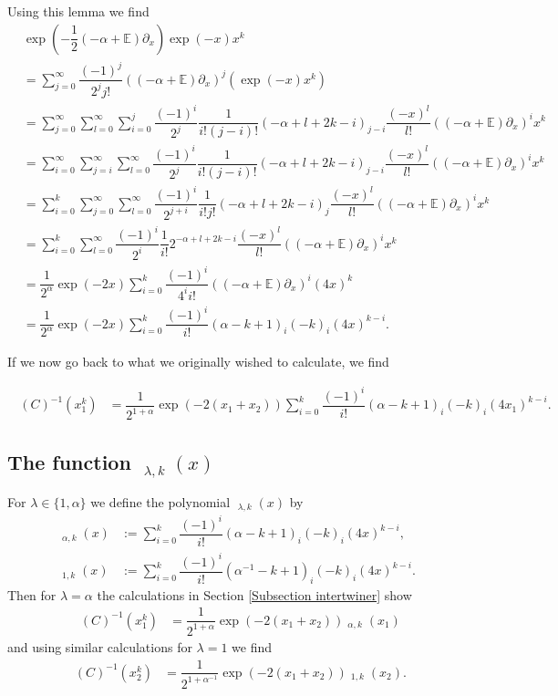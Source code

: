 \documentclass{amsart}
\numberwithin{theorem}{section}
\theoremstyle{definition}
\theoremstyle{remark}
\def\E{\mathds{E} }
\DeclareMathOperator{\KO}{\widetilde U}
\newcommand{\iSB}{\pil(C)^{-1}}
\newcommand{\pt}[1]{\partial_{#1}}
\DeclareMathOperator{\pil}{\pi_\lambda}
\begin{document}
Using this lemma we find
\begin{align*}
&\exp(-\dfrac{1}{2}(-\alpha  + \E)\pt {x})\exp(-x)x^k\\
&= \sum_{j=0}^\infty \dfrac{(-1)^j}{2^j j!}((-\alpha+\E)\pt x)^j(\exp(-x)x^k) \\
&= \sum_{j=0}^\infty \sum_{l=0}^\infty\sum_{i=0}^j\dfrac{(-1)^i}{2^j}\dfrac{1}{i!(j-i)!}(-\alpha+l+2k-i)_{j-i}\dfrac{(-x)^l}{l!}((-\alpha+\E)\pt x)^ix^k\\
&= \sum_{i=0}^\infty \sum_{j=i}^{\infty}\sum_{l=0}^\infty\dfrac{(-1)^i}{2^j}\dfrac{1}{i!(j-i)!}(-\alpha+l+2k-i)_{j-i}\dfrac{(-x)^l}{l!}((-\alpha+\E)\pt x)^ix^k\\
&= \sum_{i=0}^k \sum_{j=0}^{\infty}\sum_{l=0}^\infty\dfrac{(-1)^i}{2^{j+i}}\dfrac{1}{i!j!}(-\alpha+l+2k-i)_{j}\dfrac{(-x)^l}{l!}((-\alpha+\E)\pt x)^ix^k\\
&= \sum_{i=0}^k \sum_{l=0}^\infty\dfrac{(-1)^i}{2^{i}}\dfrac{1}{i!}2^{-\alpha+l+2k-i}\dfrac{(-x)^l}{l!}((-\alpha+\E)\pt x)^ix^k\\
&= \dfrac{1}{2^\alpha}\exp(-2x)\sum_{i=0}^k\dfrac{(-1)^i}{4^ii!}((-\alpha+\E)\pt x)^i(4x)^k\\
&= \dfrac{1}{2^\alpha}\exp(-2x)\sum_{i=0}^k \dfrac{(-1)^{i}}{i!}(\alpha-k+1)_i(-k)_i (4x)^{k-i}.
\end{align*}

If we now go back to what we originally wished to calculate, we find

\begin{align*}
\iSB(x_1^k) &= \dfrac{1}{2^{1+\alpha}}\exp(-2(x_1+x_2))\sum_{i=0}^k \dfrac{(-1)^{i}}{i!}(\alpha-k+1)_i(-k)_i (4x_1)^{k-i}.
\end{align*}

\subsection{The function $\KO_{\lambda,k}(x)$}

For $\lambda\in\{1,\alpha\}$ we define the polynomial $\KO_{\lambda,k}(x)$ by
\begin{align*}
\KO_{\alpha,k}(x) &:= \sum_{i=0}^k \dfrac{(-1)^{i}}{i!}(\alpha-k+1)_i(-k)_i (4x)^{k-i},\\
\KO_{1,k}(x) &:=  \sum_{i=0}^k \dfrac{(-1)^{i}}{i!}(\alpha^{-1}-k+1)_i(-k)_i (4x)^{k-i}.
\end{align*}
Then for $\lambda=\alpha$ the calculations in Section \ref{Subsection intertwiner} show
\begin{align*}
\iSB(x_1^k) &= \dfrac{1}{2^{1+\alpha}}\exp(-2(x_1+x_2))\KO_{\alpha,k}(x_1)
\end{align*}
and using similar calculations for $\lambda=1$ we find
\begin{align*}
\iSB(x_2^k) &= \dfrac{1}{2^{1+\alpha^{-1}}}\exp(-2(x_1+x_2))\KO_{1,k}(x_2).
\end{align*}
\end{document}

